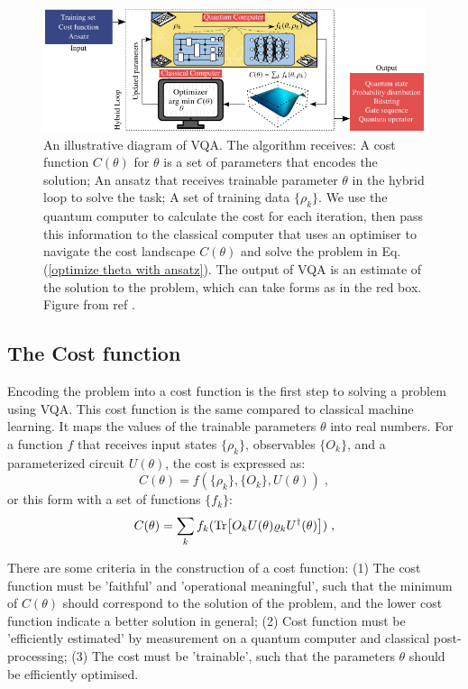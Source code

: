 \begin{figure}
    \centering
    \includegraphics[width=\textwidth]{LiteratureReview/Appendices/vqadiagram.png}
    \caption{
    An illustrative diagram of VQA. The algorithm receives: 
    A cost function $C(\theta)$ for $\theta$ is a set of parameters that encodes the solution; 
    An ansatz that receives trainable parameter $\theta$ in the hybrid loop to solve the task;
    A set of training data $\{\rho_k\}$.
    We use the quantum computer to calculate the cost for each iteration, then pass this information to the classical computer that uses an optimiser to navigate the cost landscape $C(\theta)$ and solve the problem in Eq. (\ref{optimize theta with ansatz}).
    The output of VQA is an estimate of the solution to the problem, which can take forms as in the red box.
    Figure from ref \cite{cerezo2021variational}.
    }
    \label{VQA diagram}
\end{figure}

\subsection{The Cost function}
Encoding the problem into a cost function is the first step to solving a problem using VQA.
This cost function is the same  compared to classical machine learning. It maps the values of the trainable parameters $\theta$ into real numbers.
For a function $f$ that receives input states $\{\rho_k\}$, observables $\{O_k\}$, and a parameterized circuit $U(\theta)$, the cost is expressed as:
\begin{equation}
    C(\theta) = f(\{\rho_k\}, \{O_k\}, U(\theta)) \;,
\end{equation}
or this form with a set of functions $\{ f_k \}$:
\begin{equation}
    C(\theta) = \sum_k f_k(\Tr[ O_k U(\theta) \varrho_k U^\dagger(\theta) ]) \;,
    \label{Cost function}
\end{equation}

There are some criteria in the construction of a cost function: 
(1) The cost function must be 'faithful' and 'operational meaningful', such that the minimum of $C(\theta)$ should correspond to the solution of the problem, and the lower cost function indicate a better solution in general;
(2) Cost function must be 'efficiently estimated' by measurement on a quantum computer and classical post-processing;
(3) The cost must be 'trainable', such that the parameters $\theta$ should be efficiently optimised.

